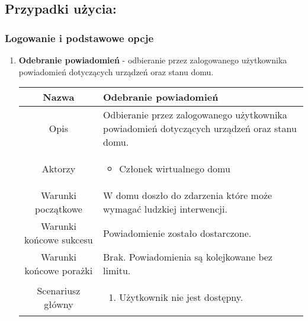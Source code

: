 \documentclass{article}
\begin{document}
	\subsection{Przypadki użycia: }
	\begin{enumerate}
		\subsubsection{Logowanie i podstawowe opcje}
		\begin{enumerate}
			\item \textbf{Odebranie powiadomień} - odbieranie przez zalogowanego
				użytkownika powiadomień dotyczących urządzeń oraz stanu domu.
				\begin{table}[H]
					\centering
					\begin{tabular}{|c|p{7cm}|}
						\hline
						Nazwa                   & \textbf{Odebranie powiadomień}                                                                                                                                                                                                                                 \\
						\hline
						Opis                    & Odbieranie przez zalogowanego użytkownika powiadomień dotyczących urządzeń oraz stanu domu.                                                                                                                                                                    \\
						\hline
						Aktorzy                 & \begin{itemize}\item Członek wirtualnego domu\end{itemize}                                                                                                                                                                                                     \\
						\hline
						Warunki początkowe      & W domu doszło do zdarzenia które może wymagać ludzkiej interwencji.                                                                                                                                                                                            \\
						\hline
						Warunki końcowe sukcesu & Powiadomienie zostało dostarczone.                                                                                                                                                                                                                             \\
						\hline
						Warunki końcowe porażki & Brak. Powiadomienia są kolejkowane bez limitu.                                                                                                                                                                                                                 \\
						\hline
						Scenariusz główny       & \begin{enumerate}\item Użytkownik nie jest dostępny.


\end{enumerate}
\end{tabular}
\end{table}
\end{enumerate}
\end{enumerate}
\end{document}
